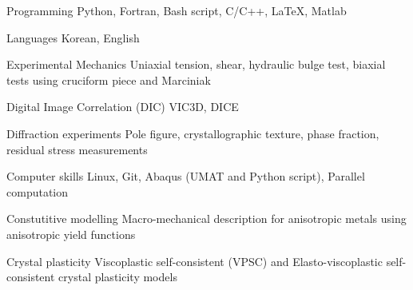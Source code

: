 

\begin{cvskills}
  \cvskill
  {Programming}
  {Python, Fortran, Bash script, C/C++, LaTeX, Matlab}

  \cvskill
  {Languages}
  {Korean, English}

  \cvskill
  {Experimental Mechanics}
  {Uniaxial tension, shear, hydraulic bulge test, biaxial tests using cruciform piece and Marciniak}

  \cvskill
  {Digital Image Correlation (DIC)}
  {VIC3D, DICE}

  \cvskill
  {Diffraction experiments}
  {Pole figure, crystallographic texture, phase fraction, residual stress measurements}

  \cvskill
  {Computer skills}
  {Linux, Git, Abaqus (UMAT and Python script), Parallel computation}

  \cvskill
  {Constutitive modelling}
  {Macro-mechanical description for anisotropic metals using anisotropic yield functions}

  \cvskill
  {Crystal plasticity}
  {Viscoplastic self-consistent (VPSC) and Elasto-viscoplastic self-consistent crystal plasticity models}


\end{cvskills}